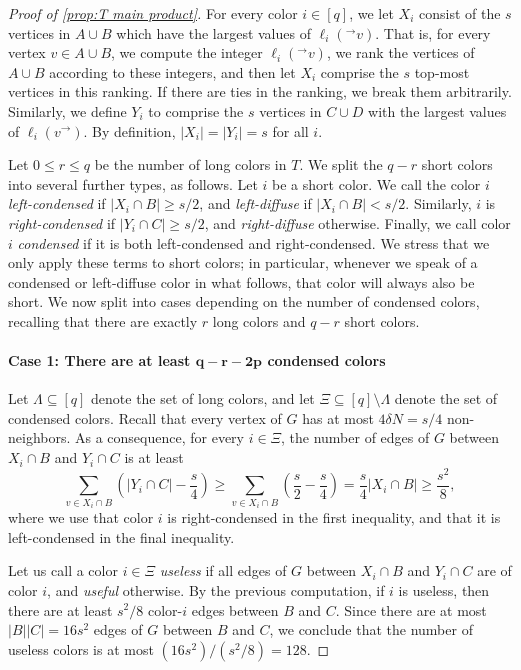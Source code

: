 \documentclass[11pt,reqno]{amsart}
\theoremstyle{definition}
\newcommand\ab[1]{\lvert#1\rvert}
\newcommand\1{\mathbf{1}}
\let\leq\leqslant
\let\geq\geqslant
\begin{document}
\begin{proof}[Proof of \cref{prop:T main product}]
    For every color $i \in [q]$, we let $X_i$ consist of the $s$ vertices in $A \cup B$ which have the largest values of $\ell_i({}^\to v)$. That is, for every vertex $v \in A \cup B$, we compute the integer $\ell_i(^\to v)$, we rank the vertices of $A \cup B$ according to these integers, and then let $X_i$ comprise the $s$ top-most vertices in this ranking. If there are ties in the ranking, we break them arbitrarily. Similarly, we define $Y_i$ to comprise the $s$ vertices in $C \cup D$ with the largest values of $\ell_i(v^\to)$. By definition, $\ab{X_i}=\ab{Y_i}=s$ for all $i$. 

    

    Let $0\leq r\leq q$ be the number of long colors in $T$. We split the $q-r$ short colors into several further types, as follows.
    Let $i$ be a short color. We call the color $i$ \emph{left-condensed} if $\ab{X_i \cap B} \geq s/2$, and \emph{left-diffuse} if $\ab{X_i\cap B}<s/2$. Similarly, $i$ is \emph{right-condensed} if $\ab{Y_i\cap C}\geq s/2$, and \emph{right-diffuse} otherwise. Finally, we call color $i$ \emph{condensed} if it is both left-condensed and right-condensed. We stress that we only apply these terms to short colors; in particular, whenever we speak of a condensed or left-diffuse color in what follows, that color will always also be short. 
    We now split into cases depending on the number of condensed colors, recalling that there are exactly $r$ long colors and $q-r$ short colors. 

    \paragraph{\bf Case 1: There are at least $\bm{q-r-2p}$ condensed colors} 
    Let $\Lambda \subseteq [q]$ denote the set of long colors, and let $\Xi \subseteq [q] \setminus \Lambda$ denote the set of condensed colors.
    Recall that every vertex of $G$ has at most $4\delta N = s/4$ non-neighbors. As a consequence, for every $i \in \Xi$, the number of edges of $G$ between $X_i \cap B$ and $Y_i \cap C$ is at least
    \[
        \sum_{v \in X_i \cap B} \left(\ab{Y_i \cap C}-\frac s4\right) \geq \sum_{v \in X_i\cap B} \left( \frac s2-\frac s4 \right) =\frac s4 \ab{X_i \cap B} \geq \frac{s^2}{8},
    \]
    where we use that color $i$ is right-condensed in the first inequality, and that it is left-condensed in the final inequality.
    
    Let us call a color $i \in \Xi$ \emph{useless} if all edges of $G$ between $X_i \cap B$ and $Y_i \cap C$ are of color $i$, and \emph{useful} otherwise. By the previous computation, if $i$ is useless, then there are at least $s^2/8$ color-$i$ edges between $B$ and $C$. Since there are at most $\ab B \ab C = 16s^2$ edges of $G$ between $B$ and $C$, we conclude that the number of useless colors is at most $(16s^2)/(s^2/8)=128$. 


\end{proof}
\end{document}
